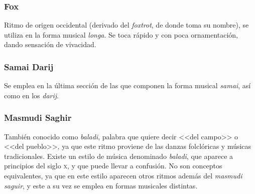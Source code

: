 
\subsubsection{Fox}

Ritmo de origen occidental (derivado del \emph{foxtrot}, de donde toma su nombre), se utiliza en la forma musical \emph{longa}. Se toca rápido y con poca ornamentación, dando sensación de vivacidad.

\begin{center}
\end{center}


\subsubsection{Samai Darij}

Se emplea en la última sección de las que componen la forma musical \emph{samai}, así como en los \emph{darij}.

\begin{center}
\end{center}


\subsubsection{Masmudi Saghir}

También conocido como \emph{baladi}, palabra que quiere decir <<del campo>> o <<del pueblo>>, ya que este ritmo proviene de las danzas folclóricas y músicas tradicionales. Existe un estilo de música denominado \emph{baladi}, que aparece a principios del siglo \textsc{x}, y que puede llevar a confusión. No son conceptos equivalentes, ya que en este estilo aparecen otros ritmos además del \emph{masmudi saguir}, y este a su vez se emplea en formas musicales distintas.

